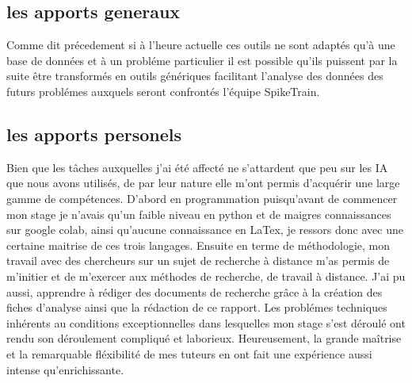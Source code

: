 \subsection{les apports generaux}
Comme dit précedement si à l'heure actuelle ces outils ne sont adaptés qu'à une base de données et à un probléme particulier il est possible qu'ils puissent par la suite être transformés en outils génériques facilitant l'analyse des données des futurs problémes auxquels seront confrontés l'équipe SpikeTrain.
\subsection{les apports personels}
Bien que les tâches auxquelles j'ai été affecté ne s'attardent que peu sur les IA que nous avons utilisés, de par leur nature elle m'ont permis d'acquérir une large gamme de compétences. D'abord en programmation puisqu'avant de commencer mon stage je n'avais qu'un faible niveau en python et de maigres connaissances sur google colab, ainsi qu'aucune connaissance en LaTex, je ressors donc avec une certaine maitrise de ces trois langages. Ensuite en terme de méthodologie, mon travail avec des chercheurs sur un sujet de recherche à distance m'as permis de m'initier et de m'exercer aux méthodes de recherche, de travail à distance. J'ai pu aussi, apprendre à rédiger des documents de recherche grâce à la création des fiches d'analyse ainsi que la rédaction de ce rapport. Les problémes techniques inhérents au conditions exceptionnelles dans lesquelles mon stage s'est déroulé ont rendu son déroulement compliqué et laborieux. Heureusement, la grande maîtrise et la remarquable fléxibilité de mes tuteurs en ont fait une expérience aussi intense qu'enrichissante.
